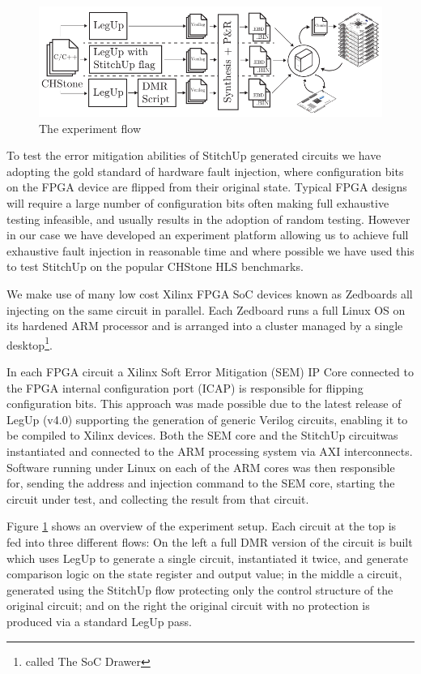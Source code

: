 \begin{figure}[t]
\centering
\includegraphics[width=6in]{./imgs/ExperimentFlow.pdf}
\caption{The experiment flow}
\label{fig:ExperimentFlow}
\end{figure}

To test the error mitigation abilities of StitchUp generated circuits we have adopting the
gold standard of hardware fault injection, where configuration bits on the 
FPGA device are flipped from their original state.
Typical FPGA designs will require a large number of configuration bits often making
full exhaustive testing infeasible, and usually results in the adoption of random
testing. 
However in our case we have developed an experiment
platform allowing us to achieve full exhaustive fault injection in reasonable time
and where possible we have used this to test StitchUp on the popular CHStone 
HLS benchmarks.

We make use of many low cost Xilinx FPGA SoC devices known as
Zedboards all injecting on the same circuit in parallel.
Each Zedboard runs a full Linux OS on its hardened ARM processor and is arranged into
a cluster managed by a single desktop\footnote{called The SoC Drawer}.

In each FPGA circuit a Xilinx Soft Error Mitigation (SEM) IP Core 
connected to the FPGA internal configuration port (ICAP) is responsible for 
flipping configuration bits.
This approach was made possible due to the latest release of LegUp
(v4.0) supporting the generation of generic Verilog circuits, enabling it to be compiled
to Xilinx devices.
Both the SEM core and the StitchUp circuitwas instantiated and connected to the 
ARM processing system via AXI interconnects.  
Software running under Linux on each of the ARM cores was then responsible for, sending the
address and injection command to the SEM core, starting the circuit under test, and
collecting the result from that circuit. 

Figure \ref{fig:ExperimentFlow} shows an overview of the experiment setup.
Each circuit at the top is fed into three different flows:
On the  left a full DMR version of the circuit is built which uses LegUp to generate a 
single circuit, instantiated it twice, and 
generate comparison logic on the state register and output value;
in the middle a circuit, generated using the StitchUp flow protecting only the control
structure of the original circuit; and on the right the original circuit with no protection
is produced via a standard LegUp pass.

